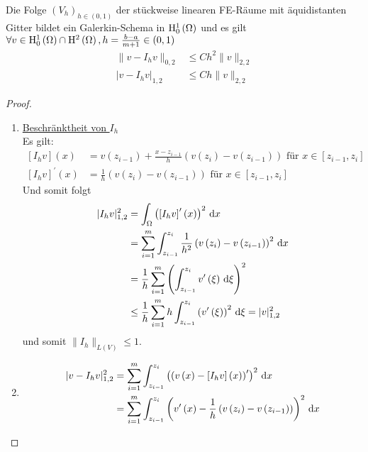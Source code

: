 \begin{lemma}[Satz]
	Die Folge $\left(V_{h}\right)_{h\in\left(0,1\right)}$ der stückweise linearen FE-Räume mit äquidistanten Gitter bildet ein Galerkin-Schema in $\mathrm{H}^{1}_{0}\left(\Omega\right)$ und es gilt $\forall v\in\mathrm{H}^{1}_{0}\left(\Omega\right)\cap \mathrm{H}^{2}\left(\Omega\right), h=\frac{b-a}{m+1}\in\left(0,1\right)${}
	\begin{align*}
		\|v-I_{h}v\|_{0,2} &\leq Ch^{2}\|v\|_{2,2}\\
		|v-I_{h}v|_{1,2} &\leq Ch\|v\|_{2,2}
	\end{align*}
\end{lemma}
\begin{proof}
	\begin{enumerate}
		\item \underline{Beschränktheit von $I_{h}$}\\
			Es gilt:
			\begin{align*}
				\left[I_{h}v\right]\left(x\right) &= v\left(z_{i-1}\right) + \frac{x-z_{i-1}}{h}\left(v\left(z_{i}\right)-v\left(z_{i-1}\right)\right) \text{ für }x\in\left[z_{i-1},z_{i}\right]\\
				\left[I_{h}v\right]^{\prime}\left(x\right) &= \frac{1}{h}\left(v\left(z_{i}\right)-v\left(z_{i-1}\right)\right) \text{ für }x\in\left[z_{i-1},z_{i}\right]
			\end{align*}
			Und somit folgt
			\begin{align*}
				|I_{h}v|_{1,2}^{2} &= \int_{\Omega}\left(\left[I_{h}v\right]^{\prime}\left(x\right)\right)^{2}\,\mathrm{d} x\\
					&= \sum_{i=1}^{m}\int_{z_{i-1}}^{z_{i}}\frac{1}{h^{2}}\left(v\left(z_{i}\right)-v\left(z_{i-1}\right)\right)^{2}\,\mathrm{d} x\\
					&= \frac{1}{h}\sum_{i=1}^{m}\left(\int_{z_{i-1}}^{z_{i}}v^{\prime}\left(\xi\right)\,\mathrm{d}\xi\right)^{2}\\
					&\leq \frac{1}{h}\sum_{i=1}^{m}h\int_{z_{i-1}}^{z_{i}}\left(v^{\prime}\left(\xi\right)\right)^{2}\,\mathrm{d}\xi = |v|_{1,2}^{2}
			\end{align*}
			und somit $\|I_{h}\|_{L\left(V\right)} \leq 1$.
		\item{}
			\begin{align*}
				|v-I_{h}v|_{1,2}^{2} &= \sum_{i=1}^{m}\int_{z_{i-1}}^{z_{i}}\left(\left(v\left(x\right)-\left[I_{h}v\right]\left(x\right)\right)^{\prime}\right)^{2}\d x\\
					&= \sum_{i=1}^{m}\int_{z_{i-1}}^{z_{i}}\left(v^{\prime}\left(x\right)-\frac{1}{h}\left(v\left(z_{i}\right)-v\left(z_{i-1}\right)\right)\right)^{2}\d x\\

\end{align*}
\end{enumerate}
\end{proof}
